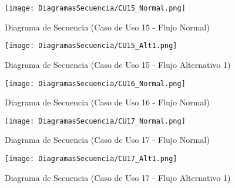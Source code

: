 \begin{landscape}
  \label{fig:Secuencia_CU15_Normal}
  \vspace*{\fill}
  \begin{figure}[!htbp]
    \centering
    \texttt{[image: DiagramasSecuencia/CU15\_Normal.png]}
    \caption{Diagrama de Secuencia (Caso de Uso 15 - Flujo Normal)}
  \end{figure}
  \vfill
\end{landscape}
\FloatBarrier

\begin{landscape}
  \label{fig:Secuencia_CU15_Alt1}
  \vspace*{\fill}
  \begin{figure}[!htbp]
    \centering
    \texttt{[image: DiagramasSecuencia/CU15\_Alt1.png]}
    \caption{Diagrama de Secuencia (Caso de Uso 15 - Flujo Alternativo 1)}
  \end{figure}
  \vfill
\end{landscape}
\FloatBarrier

\begin{landscape}
  \label{fig:Secuencia_CU16_Normal}
  \vspace*{\fill}
  \begin{figure}[!htbp]
    \centering
    \texttt{[image: DiagramasSecuencia/CU16\_Normal.png]}
    \caption{Diagrama de Secuencia (Caso de Uso 16 - Flujo Normal)}
  \end{figure}
  \vfill
\end{landscape}
\FloatBarrier


\begin{landscape}
  \label{fig:Secuencia_CU17_Normal}
  \vspace*{\fill}
  \begin{figure}[!htbp]
    \centering
    \texttt{[image: DiagramasSecuencia/CU17\_Normal.png]}
    \caption{Diagrama de Secuencia (Caso de Uso 17 - Flujo Normal)}
  \end{figure}
  \vfill
\end{landscape}
\FloatBarrier

\begin{landscape}
  \label{fig:Secuencia_CU17_Alt1}
  \vspace*{\fill}
  \begin{figure}[!htbp]
    \centering
    \texttt{[image: DiagramasSecuencia/CU17\_Alt1.png]}
    \caption{Diagrama de Secuencia (Caso de Uso 17 - Flujo Alternativo 1)}
  \end{figure}
  \vfill
\end{landscape}
\FloatBarrier

